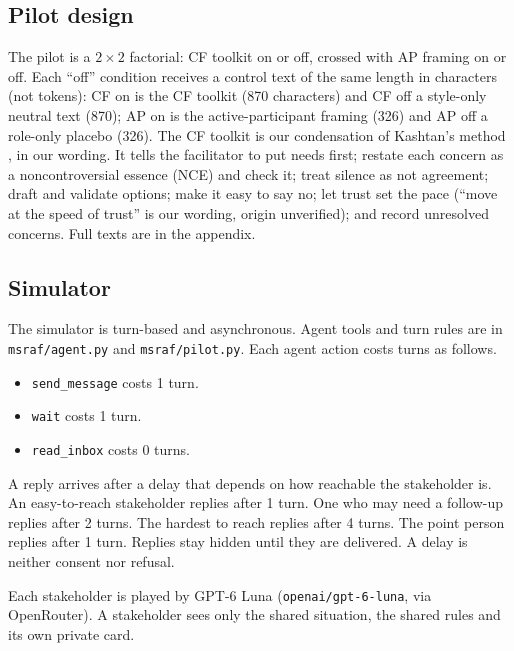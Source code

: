 \subsection{Pilot design}
The pilot is a $2{\times}2$ factorial: CF toolkit on or off, crossed with AP framing on or off.
Each ``off'' condition receives a control text of the same length in characters (not tokens):
CF on is the CF toolkit (870 characters) and CF off a style-only neutral text (870);
AP on is the active-participant framing (326) and AP off a role-only placebo (326).
The CF toolkit is our condensation of Kashtan's method \citep{kashtan2020hcd}, in our wording.
It tells the facilitator to put needs first; restate each concern as a noncontroversial essence (NCE) and check it; treat silence as not agreement; draft and validate options; make it easy to say no; let trust set the pace (``move at the speed of trust'' is our wording, origin unverified); and record unresolved concerns.
Full texts are in the appendix.

\subsection{Simulator}
The simulator is turn-based and asynchronous.
Agent tools and turn rules are in \texttt{msraf/agent.py} and \texttt{msraf/pilot.py}.
Each agent action costs turns as follows.
\begin{itemize}
  \item \texttt{send\_message} costs 1 turn.
  \item \texttt{wait} costs 1 turn.
  \item \texttt{read\_inbox} costs 0 turns.
\end{itemize}
A reply arrives after a delay that depends on how reachable the stakeholder is.
An easy-to-reach stakeholder replies after 1 turn.
One who may need a follow-up replies after 2 turns.
The hardest to reach replies after 4 turns.
The point person replies after 1 turn.
Replies stay hidden until they are delivered.
A delay is neither consent nor refusal.

Each stakeholder is played by GPT-6 Luna (\texttt{openai/gpt-6-luna}, via OpenRouter).
A stakeholder sees only the shared situation, the shared rules and its own private card.

